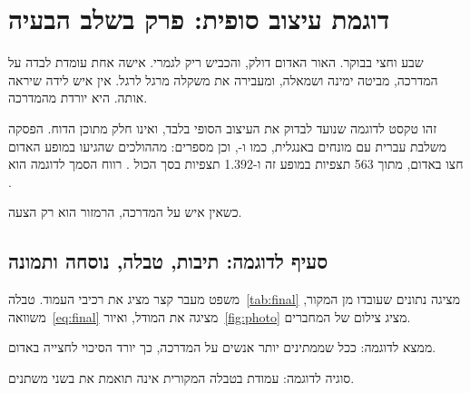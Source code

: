\chapter{דוגמת עיצוב סופית: פרק בשלב הבעיה}
\begin{scenebox}
שבע וחצי בבוקר. האור האדום דולק, והכביש ריק לגמרי. אישה אחת עומדת לבדה על המדרכה,
מביטה ימינה ושמאלה, ומעבירה את משקלה מרגל לרגל. אין איש לידה שיראה אותה.
היא יורדת מהמדרכה.
\end{scenebox}

זהו טקסט לדוגמה שנועד לבדוק את העיצוב הסופי בלבד, ואינו חלק מתוכן הדוח.
הפסקה משלבת עברית עם מונחים באנגלית, כמו  ו-,
וכן מספרים:  מההולכים שהגיעו במופע האדום חצו באדום, מתוך \num{563} תצפיות במופע זה
ו-\num{1,392} תצפיות בסך הכול \cite{rosenbloom2009}. רווח הסמך לדוגמה הוא .

\begin{statrow}[3]
\end{statrow}

\begin{pullquote}
כשאין איש על המדרכה, הרמזור הוא רק הצעה.
\end{pullquote}

\section{סעיף לדוגמה: תיבות, טבלה, נוסחה ותמונה}
משפט מעבר קצר מציג את רכיבי העמוד. טבלה~\ref{tab:final} מציגה נתונים שעובדו מן המקור, משוואה~\eqref{eq:final}
מציגה את המודל, ואיור~\ref{fig:photo} מציג צילום של המחברים.

\begin{findingbox}
ממצא לדוגמה: ככל שממתינים יותר אנשים על המדרכה, כך יורד הסיכוי לחצייה באדום.
\end{findingbox}
\begin{cautionbox}
סוגיה לדוגמה: עמודת  בטבלה המקורית אינה תואמת את  בשני משתנים.
\end{cautionbox}

